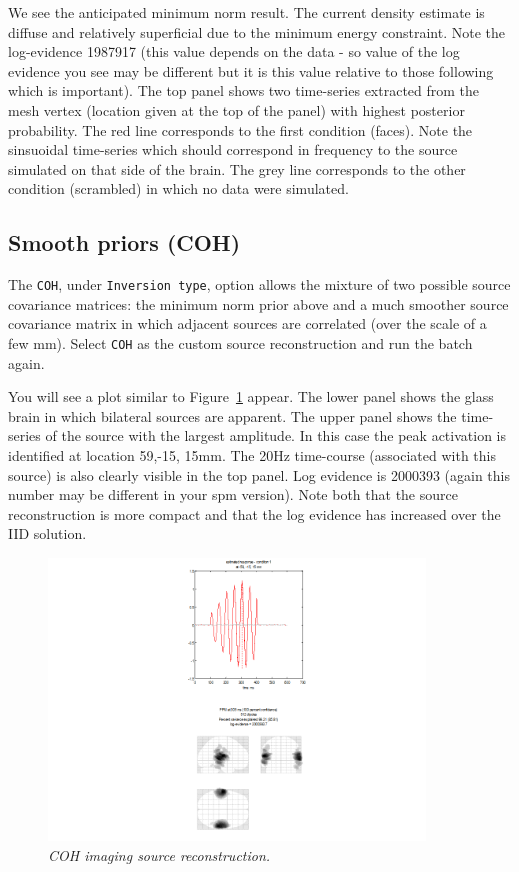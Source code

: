  
We see the anticipated minimum norm result. The current density estimate is diffuse and relatively superficial due to the minimum energy constraint.  Note the log-evidence 1987917 (this value depends on the data - so value of the log evidence you see may be different but it is this value relative to those following which is important).
The top panel shows two time-series extracted from the mesh vertex (location given at the top of the panel) with highest posterior probability.  The red line corresponds to the first condition (faces). Note the sinsuoidal time-series which should correspond in frequency to the source simulated on that side of the brain. The grey line corresponds to the other condition (scrambled) in which no data were simulated.


\subsection{Smooth priors (COH)}
The \texttt{COH}, under \texttt{Inversion type}, option allows the mixture of two possible source covariance matrices: the minimum norm prior above and a much smoother source covariance matrix in which adjacent sources are correlated (over the scale of a few mm). Select \texttt{COH} as the custom source reconstruction and run the batch again.
 
 You will see a plot similar to Figure~\ref{meg_sloc:fig:5} appear. The lower panel shows the glass brain in which bilateral sources are apparent. The upper panel shows the time-series of the source with the largest amplitude. In this case the peak activation is identified at location 59,-15, 15mm. The 20Hz time-course (associated with this source) is also clearly visible in the top panel.  Log evidence is 2000393  (again this number may be different in your spm version). Note both that the source reconstruction is more compact and that the log evidence has increased over the IID solution.

\begin{figure}
\begin{center}
\includegraphics[width=100mm]{meg_sloc/slide5}
\caption{\em COH imaging source reconstruction.\label{meg_sloc:fig:5}}
\end{center}
\end{figure}



